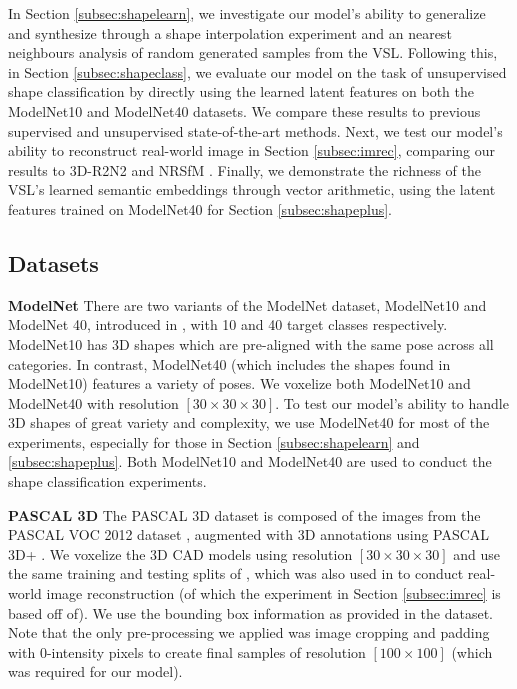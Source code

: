 \documentclass[10pt,twocolumn,letterpaper]{article}
\begin{document}
In Section \ref{subsec:shapelearn}, we investigate our model's ability to generalize and synthesize through a shape interpolation experiment and an nearest neighbours analysis of random generated samples from the VSL. Following this, in Section \ref{subsec:shapeclass}, we evaluate our model on the task of unsupervised shape classification by directly using the learned latent features on both the ModelNet10 and ModelNet40 datasets. We compare these results to previous supervised and unsupervised state-of-the-art methods. Next, we test our model's ability to reconstruct real-world image in Section \ref{subsec:imrec}, comparing our results to 3D-R2N2 \cite{choy20163d} and NRSfM \cite{kar2015category}. Finally, we demonstrate the richness of the VSL's learned semantic embeddings through vector arithmetic, using the latent features trained on ModelNet40 for Section \ref{subsec:shapeplus}.

\subsection{Datasets}
\label{subsec:datasets}
{\bf ModelNet} There are two variants of the ModelNet dataset, ModelNet10 and ModelNet 40, introduced in \cite{wu20153d}, with 10 and 40 target classes respectively. ModelNet10 has 3D shapes which are pre-aligned with the same pose across all categories. In contrast, ModelNet40 (which includes the shapes found in ModelNet10) features a variety of poses. We voxelize both ModelNet10 and ModelNet40 with resolution $[30\times 30 \times 30]$. To test our model's ability to handle 3D shapes of great variety and complexity, we use ModelNet40 for most of the experiments, especially for those in Section \ref{subsec:shapelearn} and \ref{subsec:shapeplus}. Both ModelNet10 and ModelNet40 are used to conduct the shape classification experiments.

{\bf PASCAL 3D} The PASCAL 3D dataset is composed of the images from the PASCAL VOC 2012 dataset \cite{everingham2015pascal}, augmented with 3D annotations using PASCAL 3D+ \cite{xiang_wacv14}. We voxelize the 3D CAD models using resolution $[30\times 30 \times 30]$ and use the same training and testing splits of \cite{kar2015category}, which was also used in \cite{choy20163d} to conduct real-world image reconstruction (of which the experiment in Section \ref{subsec:imrec} is based off of). We use the bounding box information as provided in the dataset. Note that the only pre-processing we applied was image cropping and padding with 0-intensity pixels to create final samples of resolution $[100\times 100]$ (which was required for our model).
\end{document}
